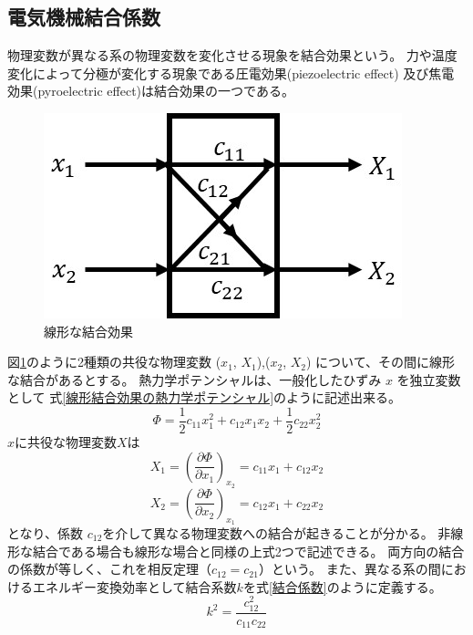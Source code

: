 \documentclass[dvipdfmx,12pt,a4paper]{jreport}
\begin{document}
			\subsection{電気機械結合係数}
			物理変数が異なる系の物理変数を変化させる現象を結合効果という。
			力や温度変化によって分極が変化する現象である圧電効果(piezoelectric effect)
			及び焦電効果(pyroelectric effect)は結合効果の一つである。

			\begin{figure}[h]
				\centering
				\includegraphics{結合効果.jpg}
				\caption{線形な結合効果}
				\label{結合効果}
			\end{figure}
			図\ref{結合効果}のように2種類の共役な物理変数 ($x_1$, $X_1$),($x_2$, $X_2$)
			について、その間に線形な結合があるとする。
			熱力学ポテンシャルは、一般化したひずみ $x$ を独立変数として
			式\ref{線形結合効果の熱力学ポテンシャル}のように記述出来る。
			\begin{equation}
				\Phi=\frac{1}{2}c_{11}x_1^2 + c_{12}x_1x_2+\frac{1}{2}c_{22}x_2^2
				\label{線形結合効果の熱力学ポテンシャル}
			\end{equation}
			$x$に共役な物理変数$X$は
			\begin{equation}
				X_1 = \left( \frac{\partial \Phi}{\partial x_1} \right)_{x_2} = c_{11}x_1+c_{12}x_2
			\end{equation}
			\begin{equation}
				X_2 = \left( \frac{\partial \Phi}{\partial x_2} \right)_{x_1} = c_{12}x_1 + c_{22}x_2
			\end{equation}
			となり、係数 $c_{12}$を介して異なる物理変数への結合が起きることが分かる。
			非線形な結合である場合も線形な場合と同様の上式2つで記述できる。
			両方向の結合の係数が等しく、これを相反定理（$c_{12}=c_{21}$）という。
			また、異なる系の間におけるエネルギー変換効率として結合系数$k$を式\ref{結合係数}のように定義する。
			\begin{equation}
				k^2=\frac{c_{12}^2}{c_{11}c_{22}}
				\label{結合係数}
			\end{equation}
			
\end{document}
